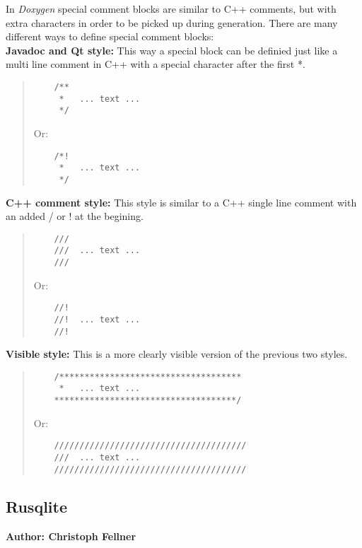 In \textit{Doxygen} special comment blocks are similar to C++ comments, but with extra characters in order to be picked up during generation. There are many different 
ways to define special comment blocks:\\
\vspace{\baselineskip}
\textbf{Javadoc and Qt style:} This way a special block can be definied just like a multi line comment in C++ with a special character after the first *.
\begin{quote}
\begin{verbatim}
    /**
     *   ... text ...
     */
\end{verbatim}
Or:
\begin{verbatim}
    /*!
     *   ... text ...
     */
\end{verbatim}
\end{quote}      
\vspace{\baselineskip}
\textbf{C++ comment style:} This style is similar to a C++ single line comment with an added / or ! at the begining.
\begin{quote}
\begin{verbatim}  
    ///
    ///  ... text ...
    ///
\end{verbatim}
Or:
\begin{verbatim}
    //!
    //!  ... text ...
    //!
\end{verbatim}
\end{quote}
\vspace{\baselineskip}
\textbf{Visible style:} This is a more clearly visible version of the previous two styles.
\begin{quote}
\begin{verbatim}
    /************************************
     *   ... text ...
    ************************************/
\end{verbatim}
Or:
\begin{verbatim}
    //////////////////////////////////////
    ///  ... text ...
    //////////////////////////////////////
\end{verbatim}
\end{quote}
\vspace{\baselineskip}


\subsection{Rusqlite}
\textbf{Author: Christoph Fellner}

